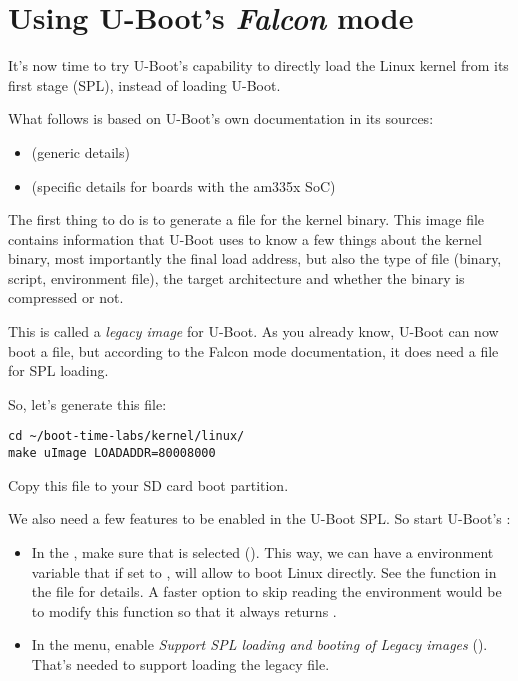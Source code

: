 \section{Using U-Boot's {\em Falcon} mode}

It's now time to try U-Boot's capability to directly load the
Linux kernel from its first stage (SPL), instead of loading U-Boot.

What follows is based on U-Boot's own documentation in its sources:
\begin{itemize}
\item {} (generic details)
\item {} (specific details for boards with
      the am335x SoC)
\end{itemize}

The first thing to do is to generate a  file for the kernel
binary. This image file contains information that U-Boot uses to know a
few things about the kernel binary, most importantly the final load
address, but also the type of file (binary, script, environment file),
the target architecture and whether the binary is compressed or not.

This is called a {\em legacy image} for U-Boot. As you already know,
U-Boot can now boot a  file, but according to the Falcon
mode documentation, it does need a  file for SPL loading.

So, let's generate this file:
\begin{verbatim}
cd ~/boot-time-labs/kernel/linux/
make uImage LOADADDR=80008000
\end{verbatim}

Copy this  file to your SD card boot partition.

We also need a few features to be enabled in the U-Boot SPL. So start
U-Boot's :
\begin{itemize}
\item In the , make sure that
       is selected
      (). This way, we
      can have a  environment variable that if set to
      , will allow to boot Linux directly. See the
       function in the
       file for details. A
      faster option to skip reading the environment would be to
      modify this function so that it always returns .
\item In the  menu, enable {\em Support SPL loading
      and booting of Legacy images}
      ().
      That's needed to support loading the legacy  file.
\end{itemize}

